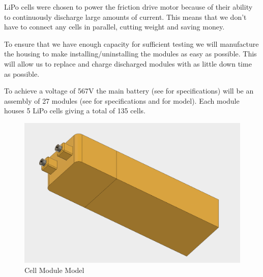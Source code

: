\documentclass[main.tex]{subfiles}
\begin{document}
    LiPo cells were chosen to power the friction drive motor because of their ability to continuously discharge large amounts of current. This means that we don't have to connect any cells in parallel, cutting weight and saving money.



    To ensure that we have enough capacity for sufficient testing we will manufacture the housing to make installing/uninstalling the modules as easy as possible. This will allow us to replace and charge discharged modules with as little down time as possible.

    To achieve a voltage of 567V the main battery (see  for specifications) will be an assembly of 27 modules (see  for specifications and  for model). Each module houses 5 LiPo cells giving a total of 135 cells.\\

     \begin{figure}[H]
        \centering
        \includegraphics[width=\linewidth]{images/cell_module}
        \caption{Cell Module Model}
        \label{fig:module-model}
    \end{figure}
\end{document}
